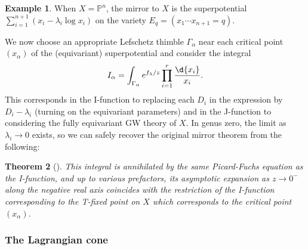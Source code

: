 \documentclass{amsart}
\newtheorem{thm}{Theorem}[section]
\theoremstyle{definition}
\newtheorem{exm}[thm]{Example}
\theoremstyle{remark}
\theoremstyle{plain}
\theoremstyle{definition}
\theoremstyle{remark}
\renewcommand{\P}{\mathbb{P}}
\newcommand{\1}{\mathbf{1}}
\newcommand{\2}{\mathbf{2}}
\newcommand{\3}{\mathbf{3}}
\begin{document}
\begin{exm}
    When \(X = \P^n\), the mirror to \(X\) is the superpotential \(\sum_{i=1}^{n+1} (x_i - \lambda_i \log x_i)\) on the variety \(E_q = (x_1 \cdots x_{n+1} = q)\).   
\end{exm}

We now choose an appropriate Lefschetz thimble \(\Gamma_{\alpha}\) near each critical point \((x_{\alpha})\) of the (equivariant) superpotential and consider the integral
\[ I_{\alpha} = \int_{\Gamma_{\alpha}} e^{f_{\lambda}/z} \prod_{i=1}^r \frac{\d{x_i}}{x_i}. \]
This corresponds in the I-function to replacing each \(D_i\) in the expression by \(D_i - \lambda_i\) (turning on the equivariant parameters) and in the J-function to considering the fully equivariant GW theory of \(X\). In genus zero, the limit as \(\lambda_i \to 0\) exists, so we can safely recover the original mirror theorem from the following:

\begin{thm}[{\cite{Givental1996}}]
    This integral is annihilated by the same Picard-Fuchs equation as the I-function, and up to various prefactors, its asymptotic expansion as \(z \to 0^-\) along the negative real axis coincides with the restriction of the I-function corresponding to the T-fixed point on \(X\) which corresponds to the critical point \(( x_{\alpha} )\). 
\end{thm}


\subsubsection{The Lagrangian cone}%
\label{ssub:The Lagrangian cone}
\end{document}
